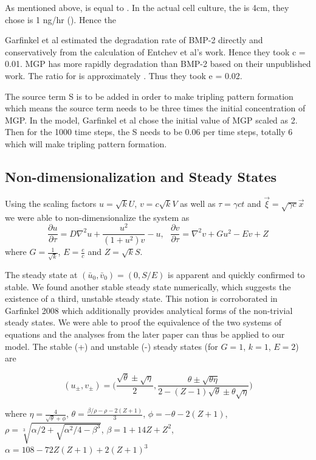\documentclass[12pt]{article}
\begin{document}
  As mentioned above,  is equal to . In the actual cell culture, the is 4cm,  they chose is 1 ng/hr (). Hence the 
  
  Garfinkel et al estimated the degradation rate of BMP-2 directly and conservatively from the calculation of Entchev et al’s work. Hence they took c = 0.01. MGP has more rapidly degradation than BMP-2 based on their unpublished work. The ratio for  is approximately . Thus they took e = 0.02.
  
  The source term S is to be added in order to make tripling pattern formation which means the source term needs to be three times the initial concentration of MGP. In the model, Garfinkel et al chose the initial value of MGP scaled as 2. Then for the 1000 time steps, the S needs to be 0.06 per time steps, totally 6 which will make tripling pattern formation.
  
  \subsection{Non-dimensionalization and Steady States}
  
  Using the scaling factors $u=\sqrt{k}U$, $v=c\sqrt{k}V$ as well as $\tau = \gamma c t$ and $\vec{\xi}=\sqrt{\gamma c} \vec{x}$ we were able to non-dimensionalize the system as
  $$\frac{\partial u}{\partial \tau} = D\nabla^2 u + \frac{u^2}{(1+u^2)v}-u,\ \ \ \frac{\partial v}{\partial \tau} = \nabla^2 v + G u^2 - E v + Z$$
  where $G=\frac{1}{\sqrt{k}}$, $E=\frac{e}{c}$ and $Z=\sqrt{k}S$.
  
  
  The steady state at $(\bar u_0,\bar v_0)=(0,S/E)$ is apparent and quickly confirmed to stable. We found another stable steady state numerically, which suggests the existence of a third, unstable steady state.
  This notion is corroborated in Garfinkel 2008 which additionally provides analytical forms of the non-trivial steady states. We were able to proof the equivalence of the two systems of equations and the analyses from the later paper can thus be applied to  our model. The stable (+) and unstable (-) steady states (for $G=1$, $k=1$, $E=2$) are
  
  $$(u_\pm,v_\pm)=\Bigg(\frac{\sqrt{\theta}\pm\sqrt{\eta}}{2}, \frac{\theta\pm\sqrt{\theta\eta}}{2-(Z-1)\sqrt{\theta}\pm\theta\sqrt{\eta}}\Bigg)$$
  
  where $\eta = \frac{4}{\sqrt{\theta}+\phi}$, $\theta=\frac{\beta/\rho-\rho-2(Z+1)}{3}$, $\phi = -\theta-2(Z+1)$, $\rho = \sqrt[3]{\alpha/2+\sqrt{\alpha^2/4-\beta^3}}$, $\beta = 1+14Z+Z^2$, $\alpha = 108-72Z(Z+1)+2(Z+1)^3$
  
\end{document}
